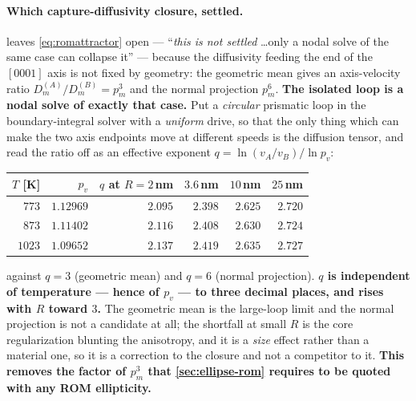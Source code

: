 \documentclass{article}
\begin{document}
\paragraph{Which capture-diffusivity closure, settled.} 
leaves \cref{eq:romattractor} open --- ``\emph{this is not settled} \dots only a
nodal solve of the same case can collapse it'' --- because the diffusivity feeding
the end of the $[0001]$ axis is not fixed by geometry: the geometric mean gives an
axis-velocity ratio $D^{(A)}_m/D^{(B)}_m=p_m^{3}$ and the normal projection
$p_m^{6}$. \textbf{The isolated loop is a nodal solve of exactly that case.} Put a
\emph{circular} prismatic loop in the boundary-integral solver with a
\emph{uniform} drive, so that the only thing which can make the two axis endpoints
move at different speeds is the diffusion tensor, and read the ratio off as an
effective exponent $q=\ln(v_A/v_B)/\ln p_v$:
\begin{center}\small
\begin{tabular}{@{}r r rrrr@{}}
\toprule
$T$ [K] & $p_v$ & $q$ at $R=2\,$nm & $3.6\,$nm & $10\,$nm & $25\,$nm\\
\midrule
$773$  & $1.12969$ & $2.095$ & $2.398$ & $2.625$ & $2.720$\\
$873$  & $1.11402$ & $2.116$ & $2.408$ & $2.630$ & $2.724$\\
$1023$ & $1.09652$ & $2.137$ & $2.419$ & $2.635$ & $2.727$\\
\bottomrule
\end{tabular}
\end{center}
against $q=3$ (geometric mean) and $q=6$ (normal projection). \textbf{$q$ is
independent of temperature --- hence of $p_v$ --- to three decimal places, and
rises with $R$ toward $3$.} The geometric mean is the large-loop limit and the
normal projection is not a candidate at all; the shortfall at small $R$ is the
core regularization blunting the anisotropy, and it is a \emph{size} effect rather
than a material one, so it is a correction to the closure and not a competitor to
it. \textbf{This removes the factor of $p_m^{3}$ that \cref{sec:ellipse-rom}
requires to be quoted with any ROM ellipticity.}
\end{document}
